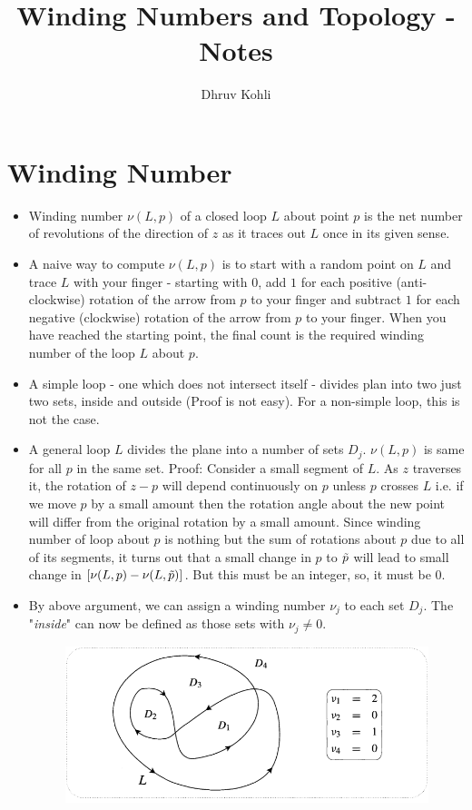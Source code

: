 \documentclass[12pt]{article}
\def\tt{\textit}
\def\td{\ensuremath\tilde}
\begin{document}
    
\title{Winding Numbers and Topology - Notes}
\author{Dhruv Kohli}
\maketitle
\section{Winding Number}
\begin{itemize}
    \item Winding number $\nu(L,p)$ of a closed loop $L$ about point $p$ is the net number of revolutions of the direction of $z$ as it traces out $L$ once in its given sense.
    \item A naive way to compute $\nu(L,p)$ is to start with a random point on $L$ and trace $L$ with your finger - starting with $0$, add $1$ for each positive (anti-clockwise) rotation of the arrow from $p$ to your finger and subtract $1$ for each negative (clockwise) rotation of the arrow from $p$ to your finger. When you have reached the starting point, the final count is the required winding number of the loop $L$ about $p$.
    \item A simple loop - one which does not intersect itself - divides plan into two just two sets, inside and outside (Proof is not easy). For a non-simple loop, this is not the case.
    \item A general loop $L$ divides the plane into a number of sets $D_{j}$. $\nu(L,p)$ is same for all $p$ in the same set. Proof: Consider a small segment of $L$. As $z$ traverses it, the rotation of $z-p$ will depend continuously on $p$ unless $p$ crosses $L$ i.e. if we move $p$ by a small amount then the rotation angle about the new point will differ from the original rotation by a small amount. Since winding number of loop about $p$ is nothing but the sum of rotations about $p$ due to all of its segments, it turns out that a small change in $p$ to $\td{p}$ will lead to small change in $[\nu(L,p)-\nu(L,\td{p})]$. But this must be an integer, so, it must be $0$.
    \item By above argument, we can assign a winding number $\nu_j$ to each set $D_j$. The "\tt{inside}" can now be defined as those sets with $\nu_j \neq 0$.
    \begin{figure}[h!]
        \centering
        \includegraphics[scale=0.7]{fig_1}

\end{figure}
\end{itemize}
\end{document}
